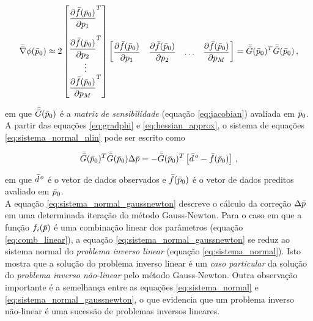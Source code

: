 \begin{equation}
\mat{\nabla}\phi(\vect{p}_0) \approx
    2
    \begin{bmatrix}
    \dfrac{\partial\vect{f}(\vect{p}_0)}{\partial p_1}^T \vspace{0.3cm}\\
    \dfrac{\partial\vect{f}(\vect{p}_0)}{\partial p_2}^T \\
    \vdots \\
    \dfrac{\partial\vect{f}(\vect{p}_0)}{\partial p_M}^T
    \end{bmatrix}
    \begin{bmatrix}
    \dfrac{\partial\vect{f}(\vect{p}_0)}{\partial p_1} &
    \dfrac{\partial\vect{f}(\vect{p}_0)}{\partial p_2} &
    \ldots &
    \dfrac{\partial\vect{f}(\vect{p}_0)}{\partial p_M}
    \end{bmatrix}
    =
    \mat{G}(\vect{p}_0)^T\mat{G}(\vect{p}_0) \thinspace ,
\label{eq:hessian_approx}
\end{equation}

\noindent em que $\bar{\bar{G}}(\bar{p}_0)$ é a {\it matriz de sensibilidade}
(equação \ref{eq:jacobian}) avaliada em $\bar{p}_0$.
\\
\indent A partir das equações \ref{eq:gradphi} e \ref{eq:hessian_approx}, o
sistema de equações \ref{eq:sistema_normal_nlin} pode ser escrito como

\begin{equation}
    \bar{\bar{G}}(\bar{p}_0)^T\bar{\bar{G}}(\bar{p}_0)\Delta\bar{p} =
        -\bar{\bar{G}}(\bar{p}_0)^T \left[
            \bar{d}^{\thinspace o} - \bar{f}(\bar{p}_0) \right]
    \thinspace ,
\label{eq:sistema_normal_gaussnewton}
\end{equation}

\noindent em que $\bar{d}^{\thinspace o}$ é o vetor de dados observados e
$\bar{f}(\bar{p}_0)$ é o vetor de dados preditos avaliado em $\bar{p}_0$.
\\
\indent A equação \ref{eq:sistema_normal_gaussnewton} descreve o cálculo da
correção $\Delta\bar{p}$ em uma determinada iteração do método Gauss-Newton.
Para o caso em que a função $f_i(\bar{p})$ é uma combinação linear dos
parâmetros (equação \ref{eq:comb_linear}), a equação
\ref{eq:sistema_normal_gaussnewton} se reduz ao sistema
normal do {\it problema inverso linear} (equação \ref{eq:sistema_normal}).
Isto mostra que a solução do problema inverso linear é um {\it caso particular}
da solução do {\it problema inverso não-linear} pelo método Gauss-Newton.
Outra observação importante é a semelhança entre as equações
\ref{eq:sistema_normal} e \ref{eq:sistema_normal_gaussnewton}, o que evidencia
que um problema inverso não-linear é uma sucessão de problemas inversos lineares.

